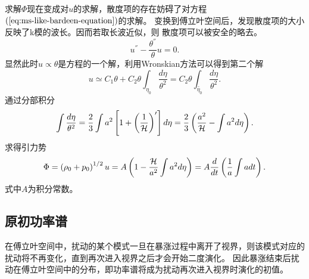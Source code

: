 求解$\Phi$现在变成对$u$的求解，散度项的存在妨碍了对方程$(\ref{eq:ms-like-bardeen-equation})$的求解。
变换到傅立叶空间后，发现散度项的大小反映了k模的波长。因而若取长波近似，则
散度项可以被安全的略去。
\begin{equation}
  u^{\dprime} - \frac{\theta^{\dprime}}{\theta} u =0. 
\end{equation}
显然此时$u\propto \theta$是方程的一个解，利用Wronskian方法可以得到第二个解
\begin{equation}
  u\simeq C_1\theta +C_2\theta \int_{\eta_0}\frac{d\eta}{\theta^2}
  =C_2\theta \int_{\tilde{\eta_0}}\frac{d\eta}{\theta^2}.
\end{equation}
通过分部积分
\begin{equation}
  \int \frac{d\eta}{\theta^2}=
  \frac{2}{3}\int a^2\left[1+\left(\frac{1}{\mathcal{H}}\right)^{\prime}\right]d\eta
  =\frac{2}{3}\left(\frac{a^2}{\mathcal{H}}-\int a^2d\eta\right).
\end{equation}
求得引力势
\begin{equation}
  \Phi=\left(\rho_0+p_0\right)^{1 /2}u
  = A\left(1-\frac{\mathcal{H}}{a^2}\int a^2d\eta\right)
  = A \frac{d}{dt}\left(\frac{1}{a}\int adt\right).
\end{equation}
式中$A$为积分常数。

\subsection{原初功率谱}
在傅立叶空间中，扰动的某个模式一旦在暴涨过程中离开了视界，则该模式对应的扰动将不再变化，直到再次进入视界之后才会开始二度演化。
因此暴涨结束后扰动在傅立叶空间中的分布，即功率谱将成为扰动再次进入视界时演化的初值。

